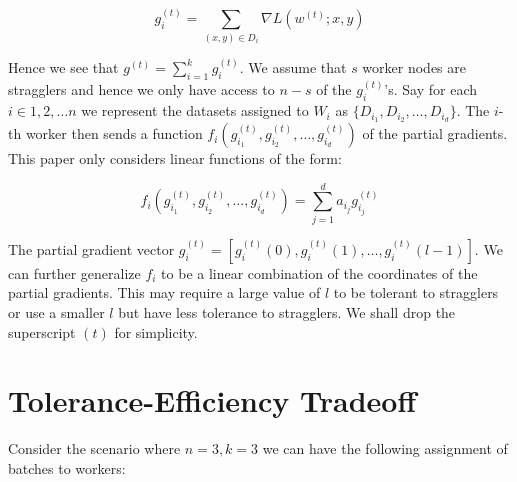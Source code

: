 \documentclass{report}
\theoremstyle{definition}
\begin{document}
\begin{equation}
    g_i^{(t)} = \sum_{(x, y) \in D_i} \nabla L(w^{(t)}; x, y)
\end{equation}

Hence we see that $g^{(t)} = \sum_{i=1}^k g_i^{(t)}$. We assume that $s$ worker nodes are stragglers and hence we only have access to $n-s$ of the $g_i^{(t)}$'s. Say for each$i \in 1, 2, \ldots n$ we represent the datasets assigned to $W_i$ as $\{D_{i_1}, D_{i_2}, \ldots, D_{i_d}\}$. The $i$-th worker then sends a function $f_i(g_{i_1}^{(t)}, g_{i_2}^{(t)}, \ldots, g_{i_d}^{(t)})$ of the partial gradients. This paper only considers linear functions of the form: 

\begin{equation}
    f_i(g_{i_1}^{(t)}, g_{i_2}^{(t)}, \ldots, g_{i_d}^{(t)}) = \sum_{j=1}^d a_{i_j} g_{i_j}^{(t)}
\end{equation}

The partial gradient vector $g_i^{(t)} = [g_i^{(t)}(0), g_i^{(t)}(1), \ldots, g_i^{(t)}(l-1)]$. We can further generalize $f_i$ to be a linear combination of the coordinates of the partial gradients. This may require a large value of $l$ to be tolerant to stragglers or use a smaller $l$ but have less tolerance to stragglers. We shall drop the superscript $(t)$ for simplicity. 

\section{Tolerance-Efficiency Tradeoff}

Consider the scenario where $n=3, k=3$ we can have the following assignment of batches to workers:
\end{document}
